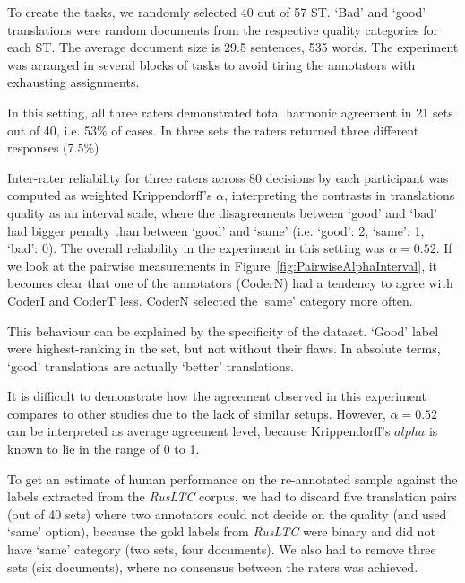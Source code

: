 
To create the tasks, we randomly selected 40 out of 57 ST. `Bad' and `good' translations were random documents from the respective quality categories for each ST. The average document size is 29.5 sentences, 535 words.  
The experiment was arranged in several blocks of tasks to avoid tiring the annotators with exhausting assignments. 

In this setting, all three raters demonstrated total harmonic agreement in 21 sets out of 40, i.e. 53\% of cases. In three sets the raters returned three different responses (7.5\%)

Inter-rater reliability for three raters across 80 decisions by each participant was computed as weighted Krippendorff's $\alpha$, interpreting the contrasts in translations quality as an interval scale, where the disagreements between `good' and `bad' had bigger penalty than between `good' and `same' (i.e. `good': 2, `same': 1, `bad': 0). The overall reliability in the experiment in this setting was $\alpha=0.52$.
If we look at the pairwise measurements in Figure~\ref{fig:PairwiseAlphaInterval}, it becomes clear that one of the annotators (CoderN) had a tendency to agree with CoderI and CoderT less. CoderN selected  the `same' category more often. 
\vspace{-2em}

This behaviour can be explained by the specificity of the dataset. `Good' label were highest-ranking in the set, but not without their flaws. In absolute terms, `good' translations are actually `better' translations.

It is difficult to demonstrate how the agreement observed in this experiment compares to other studies due to the lack of similar setups. However, $\alpha=0.52$ can be interpreted as average agreement level, because Krippendorff's $alpha$ is known to lie in the range of 0 to 1. 

To get an estimate of human performance on the re-annotated sample against the labels extracted from the \textit{RusLTC} corpus, we had to discard five translation pairs (out of 40 sets) where two annotators could not decide on the quality (and used `same' option), because the gold labels from \textit{RusLTC} were binary and did not have `same' category (two sets, four documents). We also had to remove three sets (six documents), where no consensus between the raters was achieved. 

